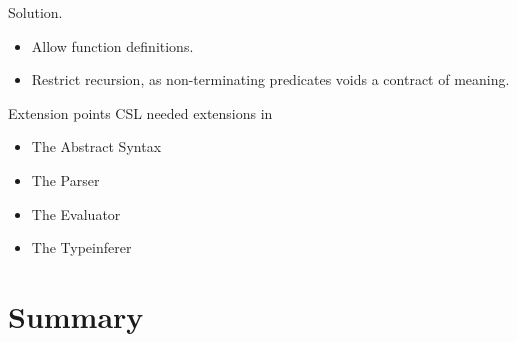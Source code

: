 \documentclass{beamer}
\begin{document}
\begin{frame}{Solution.}

  \begin{itemize}
    \item Allow function definitions.
    \item \alert{Restrict recursion}, as non-terminating predicates voids a contract of meaning.
  \end{itemize}


\end{frame}

\begin{frame}{Extension points}
CSL needed extensions in
\begin{itemize}
\item<1-> The Abstract Syntax
\item<2-> The Parser
\item<3-> The Evaluator
\item<4-> The Typeinferer
\end{itemize}
\end{frame}

\section*{Summary}
\end{document}
